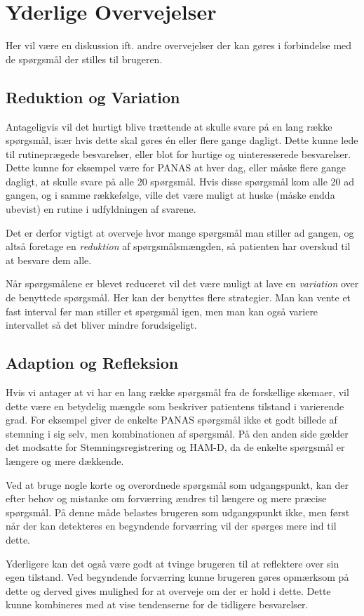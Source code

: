 \section{Yderlige Overvejelser}
Her vil være en diskussion ift. andre overvejelser der kan gøres i forbindelse med de spørgsmål der stilles til brugeren.

\subsection{Reduktion og Variation}
Antageligvis vil det hurtigt blive trættende at skulle svare på en lang række spørgsmål, især hvis dette skal gøres én eller flere gange dagligt.
Dette kunne lede til rutineprægede besvarelser, eller blot for hurtige og uinteresserede besvarelser.
Dette kunne for eksempel være for PANAS at hver dag, eller måske flere gange dagligt, at skulle svare på alle 20 spørgsmål.
Hvis disse spørgsmål kom alle 20 ad gangen, og i samme rækkefølge, ville det være muligt at huske (måske endda ubevist) en rutine i udfyldningen af svarene.

Det er derfor vigtigt at overveje hvor mange spørgsmål man stiller ad gangen, og altså foretage en \emph{reduktion} af spørgsmålsmængden, så patienten har overskud til at besvare dem alle.

Når spørgsmålene er blevet reduceret vil det være muligt at lave en \emph{variation} over de benyttede spørgsmål.
Her kan der benyttes flere strategier.
Man kan vente et fast interval før man stiller et spørgsmål igen, men man kan også variere intervallet så det bliver mindre forudsigeligt.

\subsection{Adaption og Refleksion}
Hvis vi antager at vi har en lang række spørgsmål fra de forskellige skemaer, vil dette være en betydelig mængde som beskriver patientens tilstand i varierende grad.
For eksempel giver de enkelte PANAS spørgsmål ikke et godt billede af stemning i sig selv, men kombinationen af spørgsmål.
På den anden side gælder det modsatte for Stemningsregistrering og HAM-D, da de enkelte spørgsmål er længere og mere dækkende.

Ved at bruge nogle korte og overordnede spørgsmål som udgangspunkt, kan der efter behov og mistanke om forværring ændres til længere og mere præcise spørgsmål.
På denne måde belastes brugeren som udgangspunkt ikke, men først når der kan detekteres en begyndende forværring vil der spørges mere ind til dette.

Yderligere kan det også være godt at tvinge brugeren til at reflektere over sin egen tilstand.
Ved begyndende forværring kunne brugeren gøres opmærksom på dette og derved gives mulighed for at overveje om der er hold i dette.
Dette kunne kombineres med at vise tendenserne for de tidligere besvarelser.
